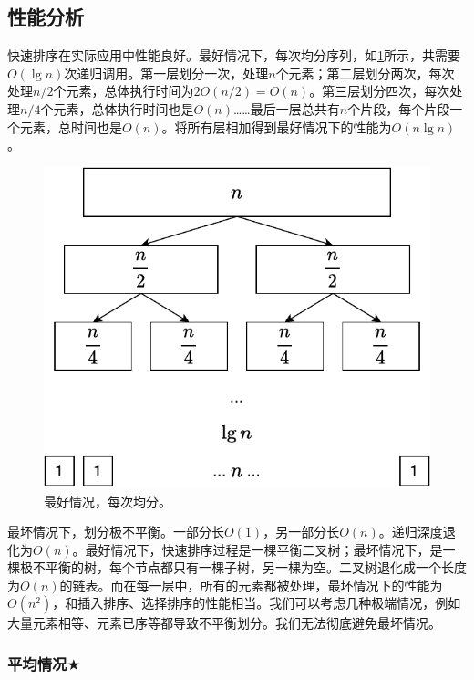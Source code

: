 \documentclass[b5paper]{ctexart}
\begin{document}
\subsection{性能分析}
 \label{sec:quick-sort-big-o}

快速排序在实际应用中性能良好。最好情况下，每次均分序列，如\cref{fig:qsort-best}所示，共需要$O(\lg n)$次递归调用。第一层划分一次，处理$n$个元素；第二层划分两次，每次处理$n/2$个元素，总体执行时间为$2 O(n/2) = O(n)$。第三层划分四次，每次处理$n/4$个元素，总体执行时间也是$O(n)$……最后一层总共有$n$个片段，每个片段一个元素，总时间也是$O(n)$。将所有层相加得到最好情况下的性能为$O(n \lg n)$。

\begin{figure}[htbp]
 \centering
 \includegraphics[scale=0.55]{img/qsort-best}
 \caption{最好情况，每次均分。}
 \label{fig:qsort-best}
\end{figure}

最坏情况下，划分极不平衡。一部分长$O(1)$，另一部分长$O(n)$。递归深度退化为$O(n)$。最好情况下，快速排序过程是一棵平衡二叉树；最坏情况下，是一棵极不平衡的树，每个节点都只有一棵子树，另一棵为空。二叉树退化成一个长度为$O(n)$的链表。而在每一层中，所有的元素都被处理，最坏情况下的性能为$O(n^2)$，和插入排序、选择排序的性能相当。我们可以考虑几种极端情况，例如大量元素相等、元素已序等都导致不平衡划分。我们无法彻底避免最坏情况。

\subsubsection{平均情况\texorpdfstring{$\bigstar$}{★}}
\end{document}
